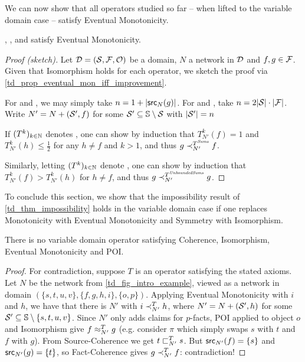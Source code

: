We can now show that all operators studied so far -- when lifted to the
variable domain case -- satisfy Eventual Monotonicity.

\begin{theorem}
    \label{td_thm_operators_satisfy_eventual_mon}
    \voting{}, \sums{}, \scvoting{} and \usums{} satisfy Eventual Monotonicity.
\end{theorem}

\begin{proof}[Proof (sketch)]
    Let $\D = (\S, \F, \O)$ be a domain, $N$ a network in $\D$ and $f, g \in
    \F$. Given that Isomorphism holds for each operator, we sketch the proof
    via \cref{td_prop_eventual_mon_iff_improvement}.

    For \voting{} and \scvoting{}, we may simply take $n = 1 + |\src_N(g)|$.
    For \sums{} and \usums{}, take $n = 2 |\S| \cdot |\F|$. Write $N' = N +
    (\S', f)$ for some $\S' \subseteq \uS \setminus \S$ with $|\S'| = n$

    If $(T^k)_{k \in \Nat}$ denotes \sums{}, one can show by induction that
    $T^k_{N'}(f) = 1$ and $T^{k}_{N'}(h) \le \frac{1}{2}$ for any $h \ne f$ and
    $k > 1$, and thus $g \flt_{N'}^{T^\sums{}} f$.

    Similarly, letting $(T^k)_{k \in \Nat}$ denote \usums{}, one can show by
    induction that $T^{k}_{N'}(f) > T^{k}_{N'}(h)$ for $h \ne f$, and thus $g
    \flt_{N'}^{T^\usums{}} g$.

\end{proof}

To conclude this section, we show that the impossibility result of
\cref{td_thm_impossibility} holds in the variable domain case if one replaces
Monotonicity with Eventual Monotonicity and Symmetry with Isomorphism.

\begin{theorem}
\label{td_thm_var_dom_impossibility}
    There is no variable domain operator satisfying Coherence, Isomorphism,
    Eventual Monotonicity and POI.
\end{theorem}

\begin{proof}
    For contradiction, suppose $T$ is an operator satisfying the stated axioms.
    Let $N$ be the network from \cref{td_fig_intro_example}, viewed as a network
    in domain $(\{s, t, u, v\}, \{f, g, h, i\}, \{o, p\})$. Applying Eventual
    Monotonicity with $i$ and $h$, we have that there is $N'$ with $i
    \flt_{N'}^T h$, where $N' = N + (\S', h)$ for some $\S' \subseteq \uS
    \setminus \{s, t, u, v\}$. Since $N'$ only adds claims for $p$-facts, POI
    applied to object $o$ and Isomorphism give $f \feq_{N'}^T g$ (e.g. consider
    $\pi$ which simply swaps $s$ with $t$ and $f$ with $g$). From
    Source-Coherence we get $t \slt_{N'}^T s$. But $\src_{N'}(f) = \{s\}$ and
    $\src_{N'}(g) = \{t\}$, so Fact-Coherence gives $g \flt_{N'}^T f$:
    contradiction!
\end{proof}

